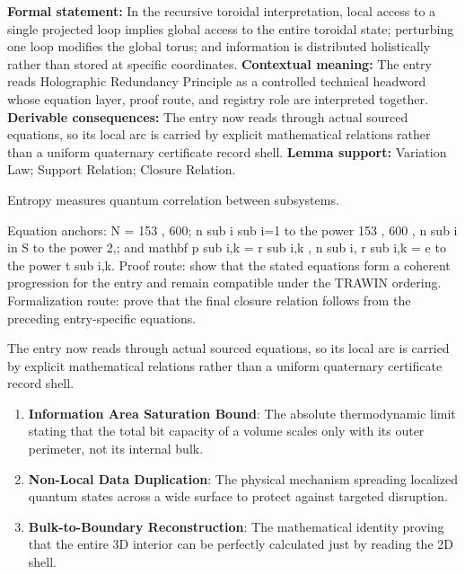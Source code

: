\begingroup\footnotesize\setlength{\emergencystretch}{3em}\sloppy
\textbf{Formal statement:} In the recursive toroidal interpretation, local access to a single projected loop implies global access to the entire toroidal state; perturbing one loop modifies the global torus; and information is distributed holistically rather than stored at specific coordinates. \textbf{Contextual meaning:} The entry reads Holographic Redundancy Principle as a controlled technical headword whose equation layer, proof route, and registry role are interpreted together. \textbf{Derivable consequences:} The entry now reads through actual sourced equations, so its local arc is carried by explicit mathematical relations rather than a uniform quaternary certificate record shell. \textbf{Lemma support:} Variation Law; Support Relation; Closure Relation.\par
\endgroup

Entropy measures quantum correlation between subsystems.

Equation anchors: N = 153 , 600; n sub i sub i=1 to the power 153 , 600 , n sub i in S to the power 2,; and mathbf p sub i,k = r sub i,k , n sub i, r sub i,k = e to the power t sub i,k. Proof route: show that the stated equations form a coherent progression for the entry and remain compatible under the TRAWIN ordering. Formalization route: prove that the final closure relation follows from the preceding entry-specific equations.

The entry now reads through actual sourced equations, so its local arc is carried by explicit mathematical relations rather than a uniform quaternary certificate record shell.
\endgroup

\begin{enumerate}[leftmargin=1.6em,itemsep=6pt,topsep=4pt]
\item \textbf{Information Area Saturation Bound}: The absolute thermodynamic limit stating that the total bit capacity of a volume scales only with its outer perimeter, not its internal bulk.
\item \textbf{Non-Local Data Duplication}: The physical mechanism spreading localized quantum states across a wide surface to protect against targeted disruption.
\item \textbf{Bulk-to-Boundary Reconstruction}: The mathematical identity proving that the entire 3D interior can be perfectly calculated just by reading the 2D shell.
\end{enumerate}

